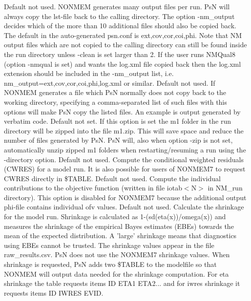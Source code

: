 \begin{optionlist}
Default not used.  NONMEM generates many output files per run. 
PsN will always copy the lst-file back to the calling directory. The option -nm\_output decides which of the more than 10 additional files should also be copied back. The default in the auto-generated psn.conf is ext,cov,cor,coi,phi. 
Note that NM output files which are not copied to the calling directory can still be found inside the run directory
unless -clean is set larger than 2. If the user runs NMQual8 (option -nmqual is set) and wants the log.xml file copied back then the log.xml extension should be included in the -nm\_output list, i.e. nm\_output=ext,cov,cor,coi,phi,log.xml or similar.
\nextopt
{}
Default not used. If NONMEM generates a file which PsN normally does not copy back to the working directory, specifying a comma-separated list of such files with this options will make PsN copy the listed files. An example is output generated by verbatim code. 
\nextopt
{}
Default not set. If this option is set the m1 folder in the run directory will be zipped into the file m1.zip.
This will save space and reduce the number of files generated by PsN. PsN will, also when option -zip is not set,
automatically unzip
zipped m1 folders when restarting/resuming a run using the -directory option.
\nextopt
{}
Default not used. Compute the conditional weighted residuals (CWRES) for a model run. It is also possible for users of NONMEM7 to request CWRES directly in \$TABLE. 
\nextopt
{}
Default not used. Compute the individual contributions to the objective function (written in file iotab$<$N$>$ in NM\_run directory). This option is disabled for NONMEM7 because the additional output phi-file contains individual ofv values. 
\nextopt
{}
Default not used. Calculate the shrinkage for the model run.  Shrinkage is calculated as 1-(sd(eta(x))/omega(x)) and measures the shrinkage of the empirical Bayes estimates (EBEs) towards the mean of the expected distribution.  A 'large' shrinkage means that diagnostics using EBEs cannot be trusted. The shrinkage values appear in the file raw\_results.csv. 
PsN does not use the NONMEM7 shrinkage values. When shrinkage is requested, PsN adds two \$TABLE to the modelfile so that NONMEM will output data needed for the shrinkage computation. For eta shrinkage the table requests items ID ETA1 ETA2... and for iwres shrinkage it requests items ID IWRES EVID. 

\end{optionlist}
